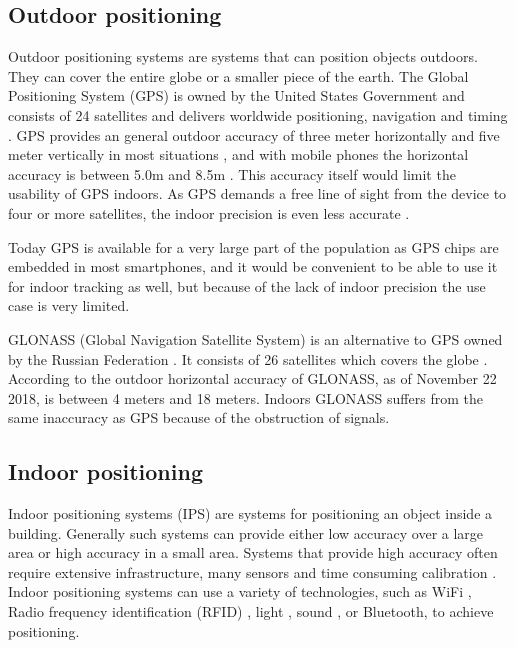 \documentclass[../Main/thesis.tex]{subfiles}
\begin{document}
\subsection{Outdoor positioning}
Outdoor positioning systems are systems that can position objects outdoors.
They can cover the entire globe or a smaller piece of the earth.
The Global Positioning System (GPS) is owned by the United States Government and consists of 24 satellites and delivers worldwide positioning, navigation and timing \citep{U.S.DepartmentofDefence2008}.
GPS provides an general outdoor accuracy of three meter horizontally and five meter vertically in most situations \citep{U.S.DepartmentofDefence2008}, and with mobile phones the horizontal accuracy is between 5.0m and 8.5m \citep{Zandbergen2011a}.
This accuracy itself would limit the usability of GPS indoors.
As GPS demands a free line of sight from the device to four or more satellites, the indoor precision is even less accurate \citep{Zandbergen2011a}.

Today GPS is available for a very large part of the population as GPS chips are embedded in most smartphones, and it would be convenient to be able to use it for indoor tracking as well, but because of the lack of indoor precision the use case is very limited.

GLONASS (Global Navigation Satellite System) is an alternative to GPS owned by the Russian Federation \citep{InformationandAnalysisCenterforPositioningNavigationandTiming2018}.
It consists of 26 satellites which covers the globe \citep{InformationandAnalysisCenterforPositioningNavigationandTiming2018a}.
According to \citet{Russiansystemofdifferentionalcorrectionandmonitoring2018} the outdoor horizontal accuracy of GLONASS, as of November 22 2018, is between 4 meters and 18 meters.
Indoors GLONASS suffers from the same inaccuracy as GPS because of the obstruction of signals.

\subsection{Indoor positioning}
\label{sec:indoor-positioning}
Indoor positioning systems (IPS) are systems for positioning an object inside a building.
Generally such systems can provide either low accuracy over a large area or high accuracy in a small area.
Systems that provide high accuracy often require extensive infrastructure, many sensors and time consuming calibration \citep{Curran2011}.
Indoor positioning systems can use a variety of technologies, such as WiFi \citep{chang2010robust}, Radio frequency identification (RFID) \citep{Saab2011}, light \citep{xiaohan2010improved}, sound \citep{schweinzer2010ultrasonic}, or Bluetooth, to achieve positioning.
\end{document}
